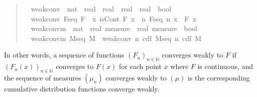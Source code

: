 \documentclass{svjour3}
\newcommand{\NN}{\mathbb{N}}
\begin{document}
\begin{quote}
\begin{isabellebody}
\isamarkupfalse%
\isanewline
\ \ weak{\isacharunderscore}conv\ {\isacharcolon}{\isacharcolon}\ {\isachardoublequoteopen}{\isacharparenleft}nat\ {\isasymRightarrow}\ {\isacharparenleft}real\ {\isasymRightarrow}\ real{\isacharparenright}{\isacharparenright}\ {\isasymRightarrow}\ {\isacharparenleft}real\ {\isasymRightarrow}\ real{\isacharparenright}\ {\isasymRightarrow}\ bool{\isachardoublequoteclose}\isanewline
{}\isanewline
\ \ {\isachardoublequoteopen}weak{\isacharunderscore}conv\ F{\isacharunderscore}seq\ F\ {\isasymequiv}\ {\isasymforall}x{\isachardot}\ isCont\ F\ x\ {\isasymlongrightarrow}\ {\isacharparenleft}{\isasymlambda}n{\isachardot}\ F{\isacharunderscore}seq\ n\ x{\isacharparenright}\ {\isacharminus}{\isacharminus}{\isacharminus}{\isacharminus}{\isachargreater}\ F\ x{\isachardoublequoteclose}\isanewline\isanewline
{}\isamarkupfalse%
\isanewline
\ \ weak{\isacharunderscore}conv{\isacharunderscore}m\ {\isacharcolon}{\isacharcolon}\ {\isachardoublequoteopen}{\isacharparenleft}nat\ {\isasymRightarrow}\ real\ measure{\isacharparenright}\ {\isasymRightarrow}\ real\ measure\ {\isasymRightarrow}\ bool{\isachardoublequoteclose}\isanewline
{}\isanewline
\ \ {\isachardoublequoteopen}weak{\isacharunderscore}conv{\isacharunderscore}m\ M{\isacharunderscore}seq\ M\ {\isasymequiv}\ weak{\isacharunderscore}conv\ {\isacharparenleft}{\isasymlambda}n{\isachardot}\ cdf\ {\isacharparenleft}M{\isacharunderscore}seq\ n{\isacharparenright}{\isacharparenright}\ {\isacharparenleft}cdf\ M{\isacharparenright}{\isachardoublequoteclose}
\end{isabellebody}
\end{quote}
In other words, a sequence of functions $(F_n)_{n \in \NN}$ converges weakly to $F$ if $(F_n(x))_{n \in \NN}$ converges to $F(x)$ for each point $x$ where $F$ is continuous, and the sequence of measures $(\mu_n)$ converges weakly to $(\mu)$ is the corresponding cumulative distribution functions converge weakly.
\end{document}
